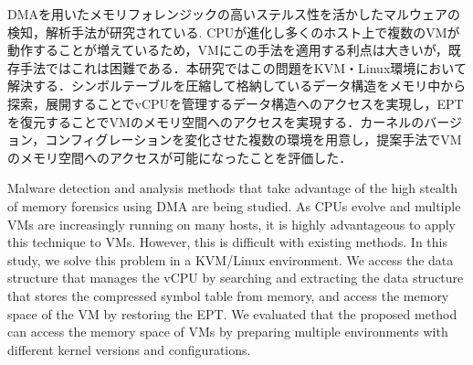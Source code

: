 \begin{jabstract}

DMAを用いたメモリフォレンジックの高いステルス性を活かしたマルウェアの検知，解析手法が研究されている. CPUが進化し多くのホスト上で複数のVMが動作することが増えているため，VMにこの手法を適用する利点は大きいが，既存手法ではこれは困難である．本研究ではこの問題をKVM・Linux環境において解決する．シンボルテーブルを圧縮して格納しているデータ構造をメモリ中から探索，展開することでvCPUを管理するデータ構造へのアクセスを実現し，EPTを復元することでVMのメモリ空間へのアクセスを実現する．カーネルのバージョン，コンフィグレーションを変化させた複数の環境を用意し，提案手法でVMのメモリ空間へのアクセスが可能になったことを評価した．

\end{jabstract}


\begin{eabstract}

Malware detection and analysis methods that take advantage of the high stealth of memory forensics using DMA are being studied. As CPUs evolve and multiple VMs are increasingly running on many hosts, it is highly advantageous to apply this technique to VMs. However, this is difficult with existing methods. In this study, we solve this problem in a KVM/Linux environment. We access the data structure that manages the vCPU by searching and extracting the data structure that stores the compressed symbol table from memory, and access the memory space of the VM by restoring the EPT. We evaluated that the proposed method can access the memory space of VMs by preparing multiple environments with different kernel versions and configurations.

\end{eabstract}
